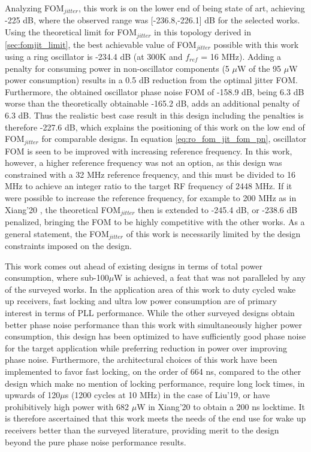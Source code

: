 Analyzing FOM$_{jitter}$, this work is on the lower end of being state of art, achieving -225 dB, where the observed range was [-236.8,-226.1] dB for the selected works. Using the theoretical limit for FOM$_{jitter}$ in this topology derived in \ref{sec:fomjit_limit}, the best achievable value of FOM$_{jitter}$ possible with this work using a ring oscillator is -234.4 dB (at 300K and $f_{ref}$ = 16 MHz). Adding a penalty for consuming power in non-oscillator components (5 $\mu$W of the 95 $\mu$W power consumption) results in a 0.5 dB reduction from the optimal jitter FOM. Furthermore, the obtained oscillator phase noise FOM of -158.9 dB, being 6.3 dB worse than the theoretically obtainable -165.2 dB, adds an additional penalty of 6.3 dB. Thus the realistic best case result in this design including the penalties is therefore -227.6 dB, which explains the positioning of this work on the low end of FOM$_{jitter}$ for comparable designs. In equation \ref{eq:ro_fom_jit_fom_pn}, oscillator FOM is seen to be improved with increasing reference frequency. In this work, however, a higher reference frequency was not an option, as this design was constrained with a 32 MHz reference frequency, and this must be divided to 16 MHz to achieve an integer ratio to the target RF frequency of 2448 MHz. If it were possible to increase the reference frequency, for example to 200 MHz as in Xiang'20 \cite{Xiang2020}, the theoretical FOM$_{jitter}$ then is extended to -245.4 dB, or -238.6 dB penalized, bringing the FOM to be highly competitive with the other works. As a general statement, the FOM$_{jitter}$ of this work is necessarily limited by the design constraints imposed on the design.

This work comes out ahead of existing designs in terms of total power consumption, where sub-100$\mu$W is achieved, a feat that was not paralleled by any of the surveyed works. In the application area of this work to duty cycled wake up receivers, fast locking and ultra low power consumption are of primary interest in terms of PLL performance. While the other surveyed designs obtain better phase noise performance than this work with simultaneously higher power consumption, this design has been optimized to have sufficiently good phase noise for the target application while preferring reduction in power over improving phase noise. Furthermore, the architectural choices of this work have been implemented to favor fast locking, on the order of 664 ns, compared to the other design which make no mention of locking performance, require long lock times, in upwards of 120$\mu$s (1200 cycles at 10 MHz) in the case of Liu'19, or have prohibitively high power with 682 $\mu$W in Xiang'20 to obtain a 200 ns locktime. It is therefore ascertained that this work meets the needs of the end use for wake up receivers better than the surveyed literature, providing merit to the design beyond the pure phase noise performance results.

